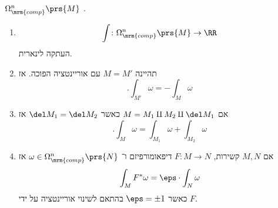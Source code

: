 \documentclass[a4paper,10pt,twoside,openany]{book}
\begin{document}
\begin{definition}
$\Omega^n_{\mrm{comp}}\prs{M}$
.
\end{definition}

\begin{proposition}
\begin{enumerate}
\item \[\int \colon \Omega^n_{\mrm{comp}}\prs{M} \to \RR\]
העתקה לינארית.
\item תהיינה
$M = M'$
עם אוריינטציה הפוכה. אז
\[\text{.} \int_{M'} \omega = -\int_M \omega\]
\item אם
$M = M_1 \amalg M_2 \amalg \del M_1$
כאשר
$\del M_1 = \del M_2$
אז
\[\text{.} \int_M \omega = \int_{M_1} \omega + \int_{M_2} \omega\]
\item אם
$M,N$
קשירות,
$F \colon M \to N$
דיפאומורפיזם ו־%
$\omega \in \Omega_{\mrm{comp}}^n \prs{N}$
אז
\[\int_M F^* \omega = \eps \cdot \int_N \omega\]
כאשר
$\eps = \pm 1$
בהתאם לשינוי אוריינטציה על ידי
$F$.
\end{enumerate}
\end{proposition}

\backmatter
\end{document}
